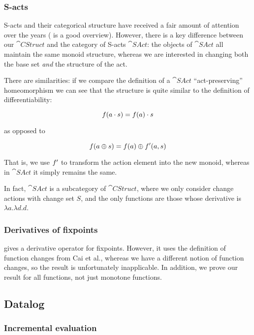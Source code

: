 \subsubsection{S-acts}

S-acts and their categorical structure have received a fair amount of attention
over the years (\textcite{kilp2000monoids} is a good
overview). However, there is a key difference between our $\cat{CStruct}$ and the category of
S-acts $\cat{SAct}$: the objects of $\cat{SAct}$ all maintain the same monoid
structure, whereas we are interested in changing both the base set \emph{and} the structure of the act.

There are similarities: if we compare the definition of a $\cat{SAct}$ ``act-preserving''
homeomorphism \autocite[See][]{kilp2000monoids} we can see that the structure is
quite similar to the definition of differentiability:

$$f(a \cdot s) = f(a) \cdot s$$

as opposed to

$$f(a \oplus s) = f(a) \oplus f'(a, s)$$

That is, we use $f'$ to transform the action element into the new
monoid, whereas in $\cat{SAct}$ it simply remains the same.

In fact, $\cat{SAct}$ is a subcategory of $\cat{CStruct}$, where we only
consider change actions with change set $S$, and the only functions are those
whose derivative is $\lambda a. \lambda d. d$.

\subsubsection{Derivatives of fixpoints}

\textcite{arntz2017fixpoints} gives a derivative operator for fixpoints. However,
it uses the definition of function changes from Cai et al., whereas
we have a different notion of function changes, so the result is unfortunately
inapplicable. In addition, we prove our result for all functions, not just
monotone functions.

\subsection{Datalog}

\subsubsection{Incremental evaluation}

